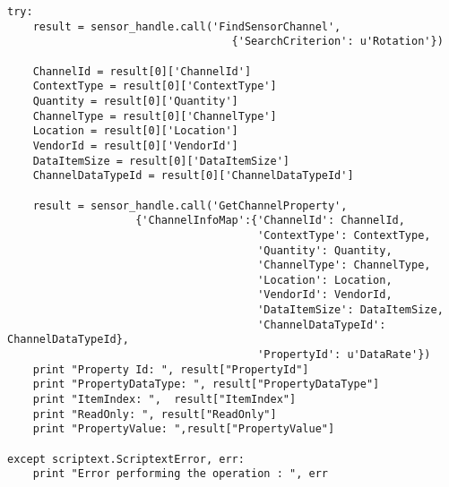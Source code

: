 \begin{verbatim}
try:
    result = sensor_handle.call('FindSensorChannel',
                                   {'SearchCriterion': u'Rotation'})

    ChannelId = result[0]['ChannelId']
    ContextType = result[0]['ContextType']
    Quantity = result[0]['Quantity']
    ChannelType = result[0]['ChannelType']
    Location = result[0]['Location']
    VendorId = result[0]['VendorId']
    DataItemSize = result[0]['DataItemSize']
    ChannelDataTypeId = result[0]['ChannelDataTypeId']

    result = sensor_handle.call('GetChannelProperty',
                    {'ChannelInfoMap':{'ChannelId': ChannelId,
                                       'ContextType': ContextType,
                                       'Quantity': Quantity,
                                       'ChannelType': ChannelType,
                                       'Location': Location,
                                       'VendorId': VendorId,
                                       'DataItemSize': DataItemSize,
                                       'ChannelDataTypeId': ChannelDataTypeId},
                                       'PropertyId': u'DataRate'})
    print "Property Id: ", result["PropertyId"]
    print "PropertyDataType: ", result["PropertyDataType"]
    print "ItemIndex: ",  result["ItemIndex"]
    print "ReadOnly: ", result["ReadOnly"]
    print "PropertyValue: ",result["PropertyValue"]

except scriptext.ScriptextError, err:
    print "Error performing the operation : ", err
\end{verbatim}


























       



 










